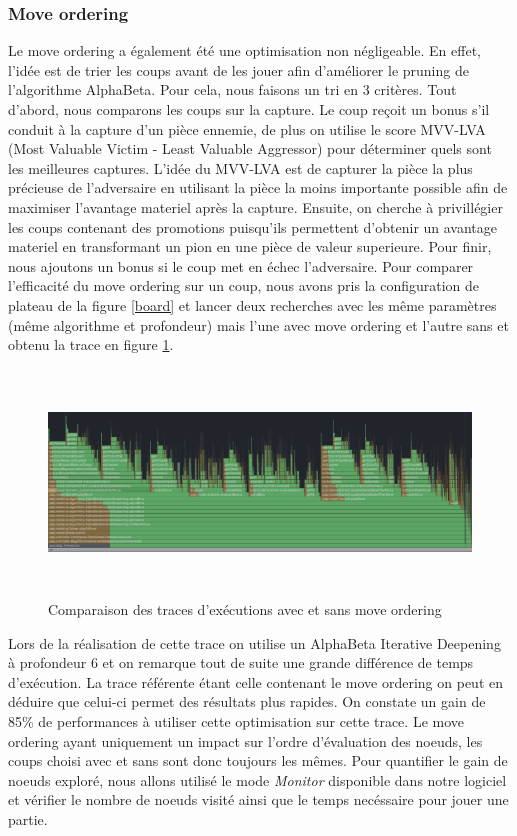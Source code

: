 \documentclass{article}
\begin{document}
\subsubsection{Move ordering}
Le move ordering a également été une optimisation non négligeable. En effet, l'idée est de trier les coups avant de les jouer afin d'améliorer le pruning de l'algorithme AlphaBeta. Pour cela,
nous faisons un tri en 3 critères. Tout d'abord, nous comparons les coups sur la capture. Le coup reçoit un bonus s'il conduit à la capture d'un pièce ennemie, de plus on utilise le score MVV-LVA
(Most Valuable Victim - Least Valuable Aggressor) pour déterminer quels sont les meilleures captures. L'idée du MVV-LVA est de capturer la pièce la plus précieuse de l'adversaire en utilisant la pièce
la moins importante possible afin de maximiser l'avantage materiel après la capture. Ensuite, on cherche à privillégier les coups contenant des promotions puisqu'ils permettent d'obtenir un avantage materiel
en transformant un pion en une pièce de valeur superieure. Pour finir, nous ajoutons un bonus si le coup met en échec l'adversaire. Pour comparer l'efficacité du move ordering sur un coup, nous avons pris la 
configuration de plateau de la figure \ref{board} et lancer deux recherches avec les même paramètres (même algorithme et profondeur) mais l'une avec move ordering et l'autre sans et obtenu la trace en figure \ref{move_ordering_cmp}.
\begin{figure}[h]
    \centering
    \includegraphics[width=\textwidth,height=6.0cm,keepaspectratio]{trace_move_ordering.png}
    \caption{Comparaison des traces d'exécutions avec et sans move ordering}
    \label{move_ordering_cmp}
\end{figure}
\FloatBarrier

Lors de la réalisation de cette trace on utilise un AlphaBeta Iterative Deepening à profondeur 6 et on remarque tout de suite une grande différence de temps d'exécution. La trace référente
étant celle contenant le move ordering on peut en déduire que celui-ci permet des résultats plus rapides. On constate un gain de 85\% de performances à utiliser cette optimisation sur cette trace.
Le move ordering ayant uniquement un impact sur l'ordre d'évaluation des noeuds, les coups choisi avec et sans sont donc toujours les mêmes. Pour quantifier le gain de noeuds exploré, nous allons 
utilisé le mode \textit{Monitor} disponible dans notre logiciel et vérifier le nombre de noeuds visité ainsi que le temps necéssaire pour jouer une partie. 
\end{document}
